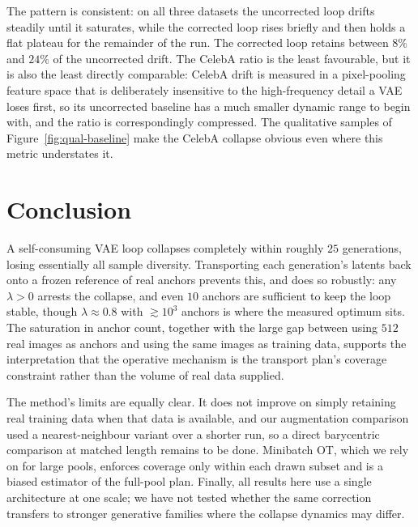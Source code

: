 \documentclass{article}
\begin{document}
The pattern is consistent: on all three datasets the uncorrected loop drifts steadily
until it saturates, while the corrected loop rises briefly and then holds a flat
plateau for the remainder of the run. The corrected loop retains between $8\%$ and
$24\%$ of the uncorrected drift. The CelebA ratio is the least favourable, but it is
also the least directly comparable: CelebA drift is measured in a pixel-pooling
feature space that is deliberately insensitive to the high-frequency detail a VAE
loses first, so its uncorrected baseline has a much smaller dynamic range to begin
with, and the ratio is correspondingly compressed. The qualitative samples of
Figure~\ref{fig:qual-baseline} make the CelebA collapse obvious even where this
metric understates it.

\section{Conclusion}

A self-consuming VAE loop collapses completely within roughly $25$ generations,
losing essentially all sample diversity. Transporting each generation's latents back
onto a frozen reference of real anchors prevents this, and does so robustly: any
$\lambda > 0$ arrests the collapse, and even $10$ anchors are sufficient to keep the
loop stable, though $\lambda \approx 0.8$ with $\gtrsim 10^3$ anchors is where the
measured optimum sits. The saturation in anchor count, together with the large gap
between using $512$ real images as anchors and using the same images as training data,
supports the interpretation that the operative mechanism is the transport plan's
coverage constraint rather than the volume of real data supplied.

The method's limits are equally clear. It does not improve on simply retaining real
training data when that data is available, and our augmentation comparison used a
nearest-neighbour variant over a shorter run, so a direct barycentric comparison at
matched length remains to be done. Minibatch OT, which we rely on for large pools,
enforces coverage only within each drawn subset and is a biased estimator of the
full-pool plan. Finally, all results here use a single architecture at one scale; we
have not tested whether the same correction transfers to stronger generative families
where the collapse dynamics may differ.



\end{document}
